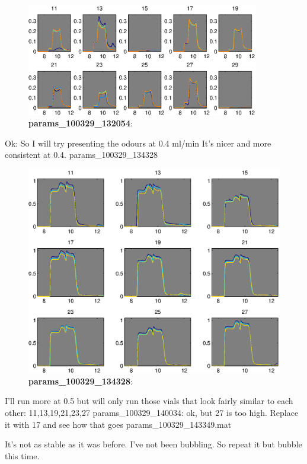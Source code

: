 \documentclass[a4paper]{report}
\begin{document}
\begin{figure}
\centering
\includegraphics[width=4in]{params_100329_132054.eps}
\caption{\textbf{params\_100329\_132054}:}
\end{figure}

\clearpage
Ok:
So I will try presenting the odours at 0.4 ml/min
It's nicer and more consistent at 0.4. 
params\_100329\_134328

\begin{figure}[h]
\centering
\includegraphics[width=5in]{params_100329_134328.eps}
\caption{\textbf{params\_100329\_134328}:}
\end{figure}


\clearpage
I'll run more at 0.5 but will only run those vials that look fairly
similar to each other: 11,13,19,21,23,27
params\_100329\_140034: ok, but 27 is too high. Replace it with 17 and
see how that goes
params\_100329\_143349.mat

It's not as stable as it was before. I've not been bubbling. So repeat
it but bubble this time. 
\end{document}
